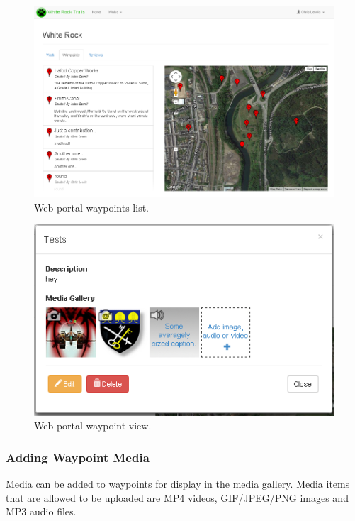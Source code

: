 \documentclass[11pt,a4paper]{report}
\begin{document}
\begin{figure}[H]
\centering
\includegraphics[width=0.8\linewidth]{./img/webportal/walk-waypoints}
\caption{Web portal waypoints list.}
\label{fig:walk-waypoints-guide}
\end{figure}

\begin{figure}[H]
\centering
\includegraphics[width=0.7\linewidth]{./img/webportal/waypoint}
\caption{Web portal waypoint view.}
\label{fig:waypoint-guide}
\end{figure}

\subsubsection{Adding Waypoint Media}

Media can be added to waypoints for display in the media gallery. Media items that are allowed to be uploaded are MP4 videos, GIF/JPEG/PNG images and MP3 audio files.
\end{document}
